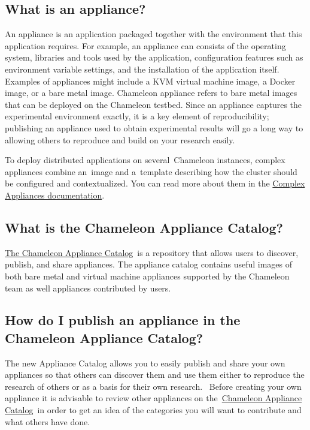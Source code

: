 \subsection{What is an appliance?}\label{what-is-an-appliance}

An appliance is an application packaged together with the environment
that this application requires. For example, an appliance can consists
of the operating system, libraries and tools used by the application,
configuration features such as environment variable settings, and the
installation of the application itself. Examples of appliances might
include a KVM virtual machine image, a Docker image, or a bare metal
image. Chameleon appliance refers to bare metal images that can be
deployed on the Chameleon testbed. Since an appliance captures the
experimental environment exactly, it is a key element of
reproducibility; publishing an appliance used to obtain experimental
results will go a long way to allowing others to reproduce and build on
your research easily.

To deploy distributed applications on several~Chameleon instances,
complex appliances combine an~image and a~template describing how the
cluster should be configured and contextualized. You can read more about
them in the
\href{https://www.chameleoncloud.org/docs/complex-appliances/}{Complex
Appliances documentation}.

\subsection{What is the Chameleon Appliance
Catalog?}\label{what-is-the-chameleon-appliance-catalog}

\href{https://www.chameleoncloud.org/appliances/}{The Chameleon
Appliance Catalog}~is a repository that allows users to discover,
publish, and share appliances. The appliance catalog contains useful
images of both bare metal and virtual machine appliances supported by
the Chameleon team as well appliances contributed by users.

\subsection{How do I publish an appliance in the Chameleon Appliance
Catalog?}\label{how-do-i-publish-an-appliance-in-the-chameleon-appliance-catalog}

The new Appliance Catalog allows you to easily publish and share your
own appliances so that others can discover them and use them either to
reproduce the research of others or as a basis for their own research.
~Before creating your own appliance it is advisable to review other
appliances on
the~\href{https://www.chameleoncloud.org/appliances/}{Chameleon
Appliance Catalog}~in order to get an idea of the categories you will
want to contribute and what others have done.~

